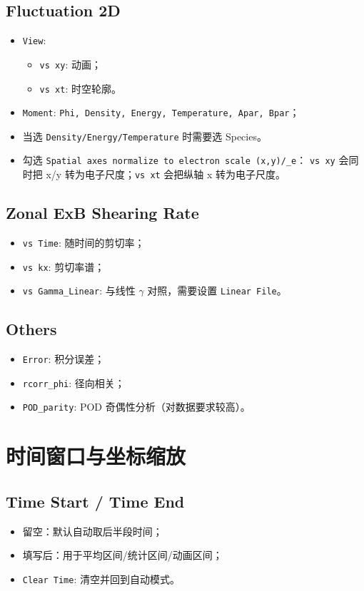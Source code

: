 \documentclass[11pt,a4paper]{ctexart}
\begin{document}
\subsection{Fluctuation 2D}
\begin{itemize}
  \item \texttt{View}:
  \begin{itemize}
    \item \texttt{vs xy}: 动画；
    \item \texttt{vs xt}: 时空轮廓。
  \end{itemize}
  \item \texttt{Moment}: \texttt{Phi, Density, Energy, Temperature, Apar, Bpar}；
  \item 当选 \texttt{Density/Energy/Temperature} 时需要选 Species。
  \item 勾选 \texttt{Spatial axes normalize to electron scale (x,y)/\rho_e}：
  \texttt{vs xy} 会同时把 x/y 转为电子尺度；\texttt{vs xt} 会把纵轴 x 转为电子尺度。
\end{itemize}

\subsection{Zonal ExB Shearing Rate}
\begin{itemize}
  \item \texttt{vs Time}: 随时间的剪切率；
  \item \texttt{vs kx}: 剪切率谱；
  \item \texttt{vs Gamma\_Linear}: 与线性 $\gamma$ 对照，需要设置 \texttt{Linear File}。
\end{itemize}

\subsection{Others}
\begin{itemize}
  \item \texttt{Error}: 积分误差；
  \item \texttt{rcorr\_phi}: 径向相关；
  \item \texttt{POD\_parity}: POD 奇偶性分析（对数据要求较高）。
\end{itemize}

\section{时间窗口与坐标缩放}
\subsection{Time Start / Time End}
\begin{itemize}
  \item 留空：默认自动取后半段时间；
  \item 填写后：用于平均区间/统计区间/动画区间；
  \item \texttt{Clear Time}: 清空并回到自动模式。
\end{itemize}
\end{document}
